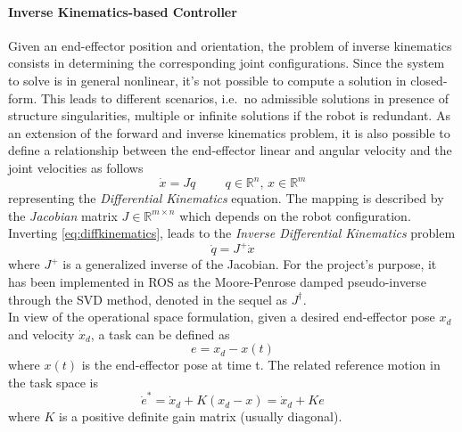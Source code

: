 \paragraph{Inverse Kinematics-based Controller}
Given an end-effector position and orientation, the problem of inverse kinematics consists in determining the corresponding joint configurations. Since the system to solve is in general nonlinear, it's not possible to compute a solution in closed-form. This leads to different scenarios, i.e.\ no admissible solutions in presence of structure singularities, multiple or infinite solutions if the robot is redundant. As an extension of the forward and inverse kinematics problem, it is also possible to define a relationship between the end-effector linear and angular velocity and the joint velocities as follows
\begin{equation}
\dot{x} = J\dot{q} \hspace{1cm} q \in \mathbb{R}^n,\,x \in \mathbb{R}^m
\label{eq:diffkinematics}
\end{equation}
representing the \textit{Differential Kinematics} equation. The mapping is described by the \textit{Jacobian} matrix $J \in \mathbb{R}^{m \times n}$ which depends on the robot configuration. Inverting \eqref{eq:diffkinematics}, leads to the \textit{Inverse Differential Kinematics} problem
\begin{equation}
\dot{q} = J^+\dot{x}
\end{equation}
where $J^+$ is a generalized inverse of the Jacobian. For the project's purpose, it has been implemented in ROS as the Moore-Penrose damped pseudo-inverse through the SVD method, denoted in the sequel as $J^{\dagger}$.\\
In view of the operational space formulation, given a desired end-effector pose $x_d$ and velocity $\dot{x}_d$, a task can be defined as
\begin{equation}
e = x_d - x(t)
\end{equation}
where $x(t)$ is the end-effector pose at time t.
The related reference motion in the task space is
\begin{equation}
\dot{e}^* = \dot{x}_d + K(x_d - x) = \dot{x}_d + Ke
\end{equation}
where $K$ is a positive definite gain matrix (usually diagonal).

